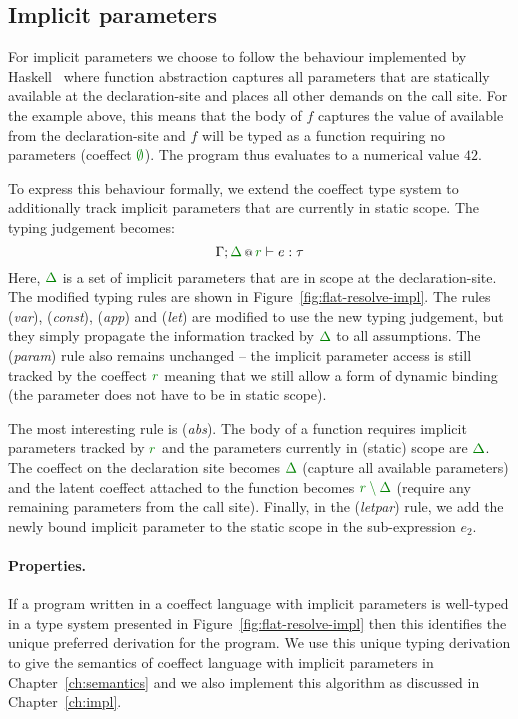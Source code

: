 \subsection{Implicit parameters}

For implicit parameters we choose to follow the behaviour implemented by Haskell~\cite{app-implicit-parameters}
where function abstraction captures all parameters that are statically available at the declaration-site
and places all other demands on the call site. For the example above, this means
that the body of $f$ captures the value of  available from the declaration-site
and $f$ will be typed as a function requiring no parameters (coeffect $\cclrd{\emptyset}$). The
program thus evaluates to a numerical value $42$.

To express this behaviour formally, we extend the coeffect type system to additionally track
implicit parameters that are currently in static scope. The typing judgement becomes:
%
\begin{equation*}
\coctx{\Gamma;\cclrd{\Delta}}{\cclrd{r}} \vdash e : \tau
\end{equation*}
%
Here, $\cclrd{\Delta}$ is a set of implicit parameters that are in scope at the declaration-site.
The modified typing rules are shown in Figure~\ref{fig:flat-resolve-impl}. The rules (\emph{var}),
(\emph{const}), (\emph{app}) and (\emph{let}) are modified to use the new typing judgement, but they
simply propagate the information tracked by $\cclrd{\Delta}$ to all assumptions. The (\emph{param})
rule also remains unchanged -- the implicit parameter access is still tracked by the coeffect
$\cclrd{r}$ meaning that we still allow a form of dynamic binding (the parameter does not have
to be in static scope).

The most interesting rule is (\emph{abs}). The body of a function requires implicit parameters
tracked by $\cclrd{r}$ and the parameters currently in (static) scope are $\cclrd{\Delta}$.
The coeffect on the declaration site becomes $\cclrd{\Delta}$ (capture all available parameters)
and the latent coeffect attached to the function becomes $\cclrd{r\setminus\Delta}$ (require any
remaining parameters from the call site). Finally, in the (\emph{letpar}) rule, we add the newly
bound implicit parameter  to the static scope in the sub-expression $e_2$.

\paragraph{Properties.}
If a program written in a coeffect language with implicit parameters is well-typed in a type
system presented in Figure~\ref{fig:flat-resolve-impl} then this identifies the unique preferred
derivation for the program. We use this unique typing derivation to give the semantics of coeffect
language with implicit parameters in Chapter~\ref{ch:semantics} and we also implement this algorithm
as discussed in Chapter~\ref{ch:impl}.

